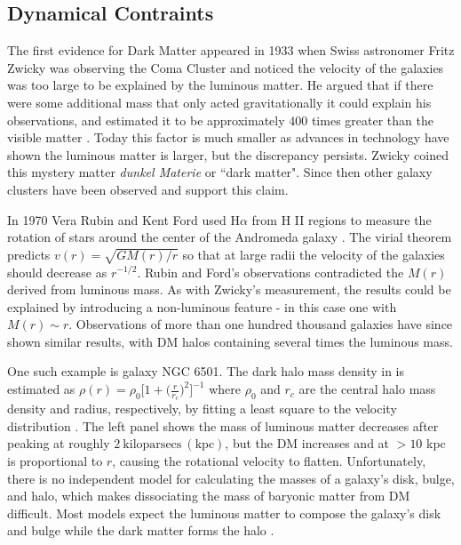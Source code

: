 \subsection{Dynamical Contraints} \label{subsec:dynamics}
The first evidence for Dark Matter appeared in 1933 when Swiss astronomer Fritz Zwicky was observing the Coma Cluster
and noticed the velocity of the galaxies was too large to be explained by the luminous matter.  He argued that if there were
some additional mass that only acted gravitationally it could explain his observations, and estimated it
to be approximately $400$ times greater than the visible matter .  Today this factor is much
smaller as advances in technology have shown the luminous matter is larger, but the discrepancy persists.  Zwicky coined this mystery
matter \textit{dunkel Materie} or ``dark matter".  Since then other galaxy clusters have been observed and support this claim.

In 1970 Vera Rubin and Kent Ford used H$\alpha$ from H II regions to measure the rotation of stars around the
center of the Andromeda galaxy .  The virial theorem predicts $v(r) = \sqrt{GM(r)/r}$ so
that at large radii the velocity of the galaxies should decrease as $r^{-1/2}$.  Rubin and Ford's observations
contradicted the $M(r)$ derived from luminous mass.  As with Zwicky's measurement, the results could be
explained by introducing a non-luminous feature - in this case one with $M(r) \sim r$.  Observations of more than
one hundred thousand galaxies have since shown similar results, with DM halos containing several times the
luminous mass.

One such example is galaxy NGC 6501.  The dark halo mass density in  is estimated as
$\rho (r) = \rho_{0} \Big[ 1 + \Big( \frac{r}{r_{c}} \Big)^{2} \Big]^{-1}$ where $\rho_{0}$ and $r_{c}$
are the central halo mass density and radius, respectively, by fitting a least square to the velocity
distribution .  The left panel shows the mass of luminous matter decreases after
peaking at roughly $2\ \mathrm{kiloparsecs\ (kpc)}$, but the DM increases and at $>10$ kpc is proportional to $r$, causing
the rotational velocity to flatten.  Unfortunately, there is no independent model for calculating the
masses of a galaxy's disk, bulge, and halo, which makes dissociating the mass of baryonic matter from
DM difficult.  Most models expect the luminous matter to compose the galaxy's disk and bulge while the dark matter forms
the halo .



